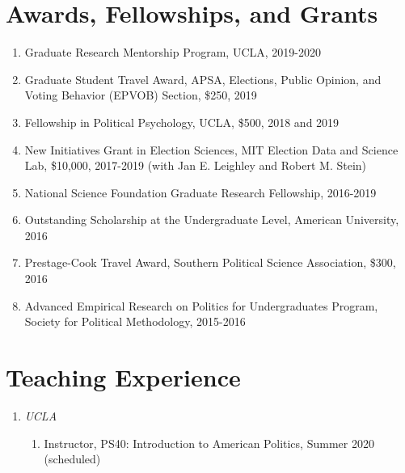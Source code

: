 \documentclass[12pt]{article}
\begin{document}
\section*{Awards, Fellowships, and Grants} 

\begin{enumerate}[topsep = 0pt, itemsep = 1ex, partopsep  = 1ex, parsep = 1ex]
	
	\item[] Graduate Research Mentorship Program, UCLA, 2019-2020
	
	\item[] Graduate Student Travel Award, APSA, Elections, Public Opinion, and Voting Behavior (EPVOB) Section, \$250, 2019
	
	\item[] Fellowship in Political Psychology, UCLA, \$500, 2018 and 2019
	
	\item[] New Initiatives Grant in Election Sciences, MIT Election Data and Science Lab, \$10,000, 2017-2019 (with Jan E. Leighley and Robert M. Stein)
	
	\item[] National Science Foundation Graduate Research Fellowship, 2016-2019
	
	\item[] Outstanding Scholarship at the Undergraduate Level, American University, 2016
	
	\item[] Prestage-Cook Travel Award, Southern Political Science Association, \$300, 2016
	
	\item[] Advanced Empirical Research on Politics for Undergraduates Program, Society for Political Methodology, 2015-2016
	
\end{enumerate}

\section*{Teaching Experience}

\begin{enumerate}[topsep = 0pt, itemsep = -1ex, partopsep  = 1ex, parsep = 1ex]
	
	\item[] \textit{UCLA}
	
	\begin{enumerate}[topsep = 0pt, itemsep = -1ex, partopsep = -1ex, parsep = 1ex]
		
		\item[] Instructor, PS40: Introduction to American Politics, Summer 2020 (scheduled)
		
	\end{enumerate}

\end{enumerate}
\end{document}
